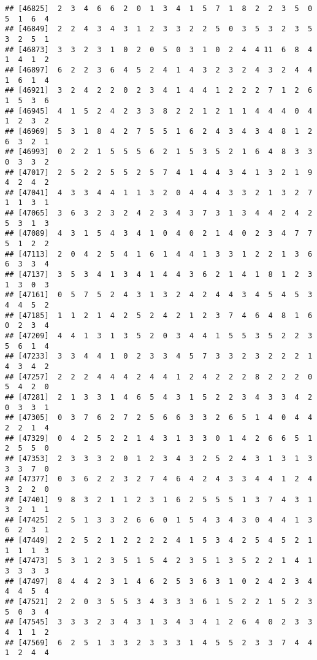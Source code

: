 \documentclass[
]{article}
\begin{document}
\begin{verbatim}
## [46825]  2  3  4  6  6  2  0  1  3  4  1  5  7  1  8  2  2  3  5  0  5  1  6  4
## [46849]  2  2  4  3  4  3  1  2  3  3  2  2  5  0  3  5  3  2  3  5  3  2  5  1
## [46873]  3  3  2  3  1  0  2  0  5  0  3  1  0  2  4  4 11  6  8  4  1  4  1  2
## [46897]  6  2  2  3  6  4  5  2  4  1  4  3  2  3  2  4  3  2  4  4  1  6  1  4
## [46921]  3  2  4  2  2  0  2  3  4  1  4  4  1  2  2  2  7  1  2  6  1  5  3  6
## [46945]  4  1  5  2  4  2  3  3  8  2  2  1  2  1  1  4  4  4  0  4  1  2  3  2
## [46969]  5  3  1  8  4  2  7  5  5  1  6  2  4  3  4  3  4  8  1  2  6  3  2  1
## [46993]  0  2  2  1  5  5  5  6  2  1  5  3  5  2  1  6  4  8  3  3  0  3  3  2
## [47017]  2  5  2  2  5  5  2  5  7  4  1  4  4  3  4  1  3  2  1  9  4  2  4  2
## [47041]  4  3  3  4  4  1  1  3  2  0  4  4  4  3  3  2  1  3  2  7  1  1  3  1
## [47065]  3  6  3  2  3  2  4  2  3  4  3  7  3  1  3  4  4  2  4  2  5  3  1  3
## [47089]  4  3  1  5  4  3  4  1  0  4  0  2  1  4  0  2  3  4  7  7  5  1  2  2
## [47113]  2  0  4  2  5  4  1  6  1  4  4  1  3  3  1  2  2  1  3  6  6  3  3  4
## [47137]  3  5  3  4  1  3  4  1  4  4  3  6  2  1  4  1  8  1  2  3  1  3  0  3
## [47161]  0  5  7  5  2  4  3  1  3  2  4  2  4  4  3  4  5  4  5  3  4  4  5  2
## [47185]  1  1  2  1  4  2  5  2  4  2  1  2  3  7  4  6  4  8  1  6  0  2  3  4
## [47209]  4  4  1  3  1  3  5  2  0  3  4  4  1  5  5  3  5  2  2  3  5  6  1  4
## [47233]  3  3  4  4  1  0  2  3  3  4  5  7  3  3  2  3  2  2  2  1  4  3  4  2
## [47257]  2  2  2  4  4  4  2  4  4  1  2  4  2  2  2  8  2  2  2  0  5  4  2  0
## [47281]  2  1  3  3  1  4  6  5  4  3  1  5  2  2  3  4  3  3  4  2  0  3  3  1
## [47305]  0  3  7  6  2  7  2  5  6  6  3  3  2  6  5  1  4  0  4  4  2  2  1  4
## [47329]  0  4  2  5  2  2  1  4  3  1  3  3  0  1  4  2  6  6  5  1  2  5  5  0
## [47353]  2  3  3  3  2  0  1  2  3  4  3  2  5  2  4  3  1  3  1  3  3  3  7  0
## [47377]  0  3  6  2  2  3  2  7  4  6  4  2  4  3  3  4  4  1  2  4  3  2  2  0
## [47401]  9  8  3  2  1  1  2  3  1  6  2  5  5  5  1  3  7  4  3  1  3  2  1  1
## [47425]  2  5  1  3  3  2  6  6  0  1  5  4  3  4  3  0  4  4  1  3  6  2  3  1
## [47449]  2  2  5  2  1  2  2  2  2  4  1  5  3  4  2  5  4  5  2  1  1  1  1  3
## [47473]  5  3  1  2  3  5  1  5  4  2  3  5  1  3  5  2  2  1  4  1  3  3  3  3
## [47497]  8  4  4  2  3  1  4  6  2  5  3  6  3  1  0  2  4  2  3  4  4  4  5  4
## [47521]  2  2  0  3  5  5  3  4  3  3  3  6  1  5  2  2  1  5  2  3  5  0  3  4
## [47545]  3  3  3  2  3  4  3  1  3  4  3  4  1  2  6  4  0  2  3  3  4  1  1  2
## [47569]  6  2  5  1  3  3  2  3  3  3  1  4  5  5  2  3  3  7  4  4  1  2  4  4

\end{verbatim}
\end{document}
